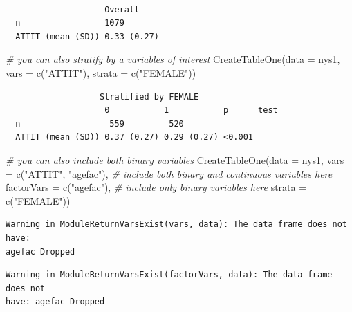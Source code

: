 \documentclass[
  letterpaper,
  DIV=11,
  numbers=noendperiod]{scrreprt}
\newenvironment{Shaded}{\begin{snugshade}}{\end{snugshade}}
\newcommand{\AttributeTok}[1]{\textcolor[rgb]{0.49,0.56,0.16}{#1}}
\newcommand{\CommentTok}[1]{\textcolor[rgb]{0.38,0.63,0.69}{\textit{#1}}}
\newcommand{\FunctionTok}[1]{\textcolor[rgb]{0.02,0.16,0.49}{#1}}
\newcommand{\NormalTok}[1]{\textcolor[rgb]{0.00,0.44,0.13}{#1}}
\newcommand{\StringTok}[1]{\textcolor[rgb]{0.25,0.44,0.63}{#1}}
\begin{document}
\begin{verbatim}
                   
                    Overall    
  n                 1079       
  ATTIT (mean (SD)) 0.33 (0.27)
\end{verbatim}

\begin{Shaded}
\begin{Highlighting}[]
\CommentTok{\# you can also stratify by a variables of interest}
  \FunctionTok{CreateTableOne}\NormalTok{(}\AttributeTok{data =}\NormalTok{ nys1,}
                 \AttributeTok{vars =} \FunctionTok{c}\NormalTok{(}\StringTok{"ATTIT"}\NormalTok{), }
                 \AttributeTok{strata =} \FunctionTok{c}\NormalTok{(}\StringTok{"FEMALE"}\NormalTok{))}
\end{Highlighting}
\end{Shaded}

\begin{verbatim}
                   Stratified by FEMALE
                    0           1           p      test
  n                  559         520                   
  ATTIT (mean (SD)) 0.37 (0.27) 0.29 (0.27) <0.001     
\end{verbatim}

\begin{Shaded}
\begin{Highlighting}[]
\CommentTok{\# you can also include both binary variables}
  \FunctionTok{CreateTableOne}\NormalTok{(}\AttributeTok{data =}\NormalTok{ nys1, }
                 \AttributeTok{vars =} \FunctionTok{c}\NormalTok{(}\StringTok{"ATTIT"}\NormalTok{, }\StringTok{"agefac"}\NormalTok{),  }\CommentTok{\# include both binary and continuous variables here}
                 \AttributeTok{factorVars =} \FunctionTok{c}\NormalTok{(}\StringTok{"agefac"}\NormalTok{), }\CommentTok{\# include only binary variables here}
                 \AttributeTok{strata =} \FunctionTok{c}\NormalTok{(}\StringTok{"FEMALE"}\NormalTok{))}
\end{Highlighting}
\end{Shaded}

\begin{verbatim}
Warning in ModuleReturnVarsExist(vars, data): The data frame does not have:
agefac Dropped
\end{verbatim}

\begin{verbatim}
Warning in ModuleReturnVarsExist(factorVars, data): The data frame does not
have: agefac Dropped
\end{verbatim}
\end{document}
